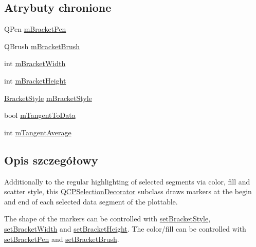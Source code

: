 \subsection*{Atrybuty chronione}
\begin{DoxyCompactItemize}
\item 
Q\+Pen \hyperlink{class_q_c_p_selection_decorator_bracket_ac7da5610713e67e92d0a882ef743a453}{m\+Bracket\+Pen}
\item 
Q\+Brush \hyperlink{class_q_c_p_selection_decorator_bracket_ae905dd458b85ac529fb9c6ec879e5680}{m\+Bracket\+Brush}
\item 
int \hyperlink{class_q_c_p_selection_decorator_bracket_a333983308322d10968c35bf2af4b392d}{m\+Bracket\+Width}
\item 
int \hyperlink{class_q_c_p_selection_decorator_bracket_a3887d29b82f4dec3bf2ddf97d5475b16}{m\+Bracket\+Height}
\item 
\hyperlink{class_q_c_p_selection_decorator_bracket_aa6d18517ec0553575bbef0de4252336e}{Bracket\+Style} \hyperlink{class_q_c_p_selection_decorator_bracket_a5ed4965200caa115da1a49f2f860e23c}{m\+Bracket\+Style}
\item 
bool \hyperlink{class_q_c_p_selection_decorator_bracket_ac08c7de0fd81b64b0f3fe31739688081}{m\+Tangent\+To\+Data}
\item 
int \hyperlink{class_q_c_p_selection_decorator_bracket_a810900616f17964cab140cbc13f40203}{m\+Tangent\+Average}
\end{DoxyCompactItemize}


\subsection{Opis szczegółowy}
Additionally to the regular highlighting of selected segments via color, fill and scatter style, this \hyperlink{class_q_c_p_selection_decorator}{Q\+C\+P\+Selection\+Decorator} subclass draws markers at the begin and end of each selected data segment of the plottable.

The shape of the markers can be controlled with \hyperlink{class_q_c_p_selection_decorator_bracket_a04507697438f6ad8cc2aeea5422dcbe5}{set\+Bracket\+Style}, \hyperlink{class_q_c_p_selection_decorator_bracket_a291b59cab98ce93a0a3c85963fe10f5e}{set\+Bracket\+Width} and \hyperlink{class_q_c_p_selection_decorator_bracket_aed773ad737201cca40efc6fe451acad8}{set\+Bracket\+Height}. The color/fill can be controlled with \hyperlink{class_q_c_p_selection_decorator_bracket_ac0e392a6097990f8aa978932a8fa05d6}{set\+Bracket\+Pen} and \hyperlink{class_q_c_p_selection_decorator_bracket_a2f4ea0bfb0ea980252b76dd349dd53aa}{set\+Bracket\+Brush}.

